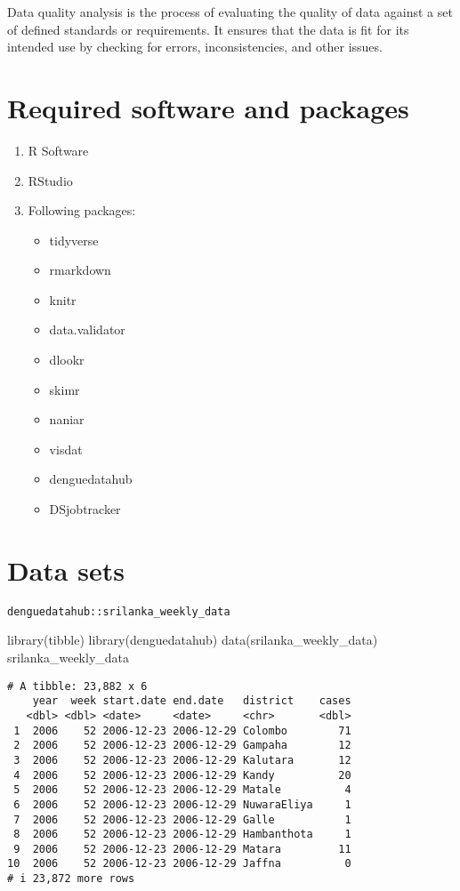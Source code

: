 \documentclass[
  letterpaper,
  DIV=11,
  numbers=noendperiod]{scrreprt}
\newenvironment{Shaded}{\begin{snugshade}}{\end{snugshade}}
\newcommand{\FunctionTok}[1]{\textcolor[rgb]{0.28,0.35,0.67}{#1}}
\newcommand{\NormalTok}[1]{\textcolor[rgb]{0.00,0.23,0.31}{#1}}
\begin{document}
Data quality analysis is the process of evaluating the quality of data
against a set of defined standards or requirements. It ensures that the
data is fit for its intended use by checking for errors,
inconsistencies, and other issues.

\section{Required software and
packages}\label{required-software-and-packages}

\begin{enumerate}
\def\labelenumi{\arabic{enumi}.}
\item
  R Software
\item
  RStudio
\item
  Following packages:

  \begin{itemize}
  \item
    tidyverse
  \item
    rmarkdown
  \item
    knitr
  \item
    data.validator
  \item
    dlookr
  \item
    skimr
  \item
    naniar
  \item
    visdat
  \item
    denguedatahub
  \item
    DSjobtracker
  \end{itemize}
\end{enumerate}

\section{Data sets}\label{data-sets}

\texttt{denguedatahub::srilanka\_weekly\_data}

\begin{Shaded}
\begin{Highlighting}[]
\FunctionTok{library}\NormalTok{(tibble)}
\FunctionTok{library}\NormalTok{(denguedatahub)}
\FunctionTok{data}\NormalTok{(srilanka\_weekly\_data)}
\NormalTok{srilanka\_weekly\_data}
\end{Highlighting}
\end{Shaded}

\begin{verbatim}
# A tibble: 23,882 x 6
    year  week start.date end.date   district    cases
   <dbl> <dbl> <date>     <date>     <chr>       <dbl>
 1  2006    52 2006-12-23 2006-12-29 Colombo        71
 2  2006    52 2006-12-23 2006-12-29 Gampaha        12
 3  2006    52 2006-12-23 2006-12-29 Kalutara       12
 4  2006    52 2006-12-23 2006-12-29 Kandy          20
 5  2006    52 2006-12-23 2006-12-29 Matale          4
 6  2006    52 2006-12-23 2006-12-29 NuwaraEliya     1
 7  2006    52 2006-12-23 2006-12-29 Galle           1
 8  2006    52 2006-12-23 2006-12-29 Hambanthota     1
 9  2006    52 2006-12-23 2006-12-29 Matara         11
10  2006    52 2006-12-23 2006-12-29 Jaffna          0
# i 23,872 more rows
\end{verbatim}
\end{document}

